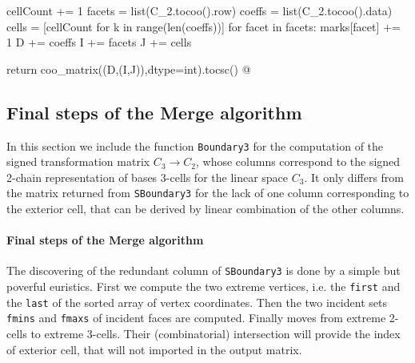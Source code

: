 \documentclass[11pt,oneside]{article}    %
\begin{document}
{		cellCount += 1
		facets = list(C_2.tocoo().row)
		coeffs = list(C_2.tocoo().data)
		cells = [cellCount for k in range(len(coeffs))]
		for facet in facets: marks[facet] += 1
		D += coeffs
		I += facets
		J += cells

	return coo_matrix((D,(I,J)),dtype=int).tocsc()
@}


\subsection{Final steps of the Merge algorithm}

In this section we include the function \texttt{Boundary3} for the computation of the signed transformation matrix $C_3\to C_2$, whose columns correspond to the signed 2-chain representation of bases 3-cells for the linear space $C_3$. It only differs from the matrix returned from \texttt{SBoundary3} for the lack of one column corresponding to the exterior cell, that can be derived by linear combination of the other columns.

\paragraph{Final steps of the Merge algorithm}
The discovering of the redundant column of \texttt{SBoundary3} is done by a simple but poverful euristics. First we compute the two extreme vertices, i.e. the \texttt{first} and the \texttt{last} of the sorted array of vertex coordinates. Then the two incident sets \texttt{fmins} and \texttt{fmaxs} of incident faces are computed. Finally moves from extreme 2-cells to extreme 3-cells. Their (combinatorial) intersection will provide the index of exterior cell, that will not imported in the output matrix.
\end{document}
